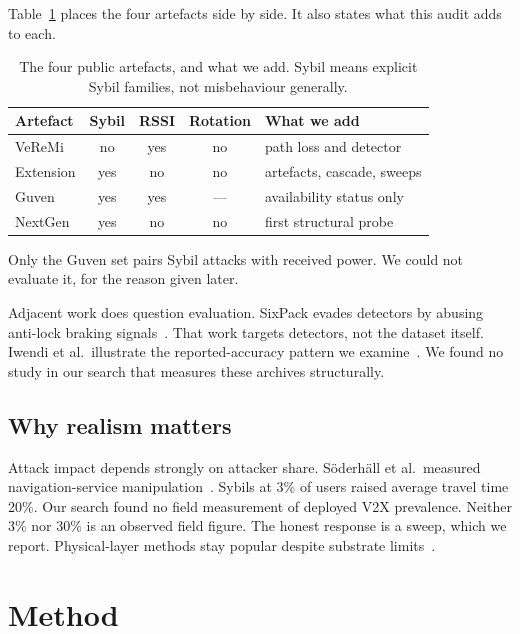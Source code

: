 \documentclass[journal,twoside]{IEEEtran}
\begin{document}
Table~\ref{tab:datasets} places the four artefacts side by side.
It also states what this audit adds to each.

\begin{table}[t]
\caption{The four public artefacts, and what we add.
Sybil means explicit Sybil families, not misbehaviour generally.}
\label{tab:datasets}
\centering
\scriptsize
\begin{tabular}{@{}>{\raggedright\arraybackslash}p{1.7cm}ccc>{\raggedright\arraybackslash}p{2.0cm}@{}}
\toprule
Artefact & Sybil & RSSI & Rotation & What we add \\
\midrule
VeReMi \cite{heijden2018} & no & yes & no & path loss and detector \\
Extension \cite{kamel2020} & yes & no & no & artefacts, cascade, sweeps \\
Guven \cite{guven2024} & yes & yes & --- & availability status only \\
NextGen \cite{nextgen2026} & yes & no & no & first structural probe \\
\bottomrule
\end{tabular}
\end{table}

Only the Guven set pairs Sybil attacks with received power.
We could not evaluate it, for the reason given later.

Adjacent work does question evaluation.
SixPack evades detectors by abusing anti-lock braking signals~\cite{sixpack2021}.
That work targets detectors, not the dataset itself.
Iwendi et al.\ illustrate the reported-accuracy pattern we examine~\cite{iwendi2018}.
We found no study in our search that measures these archives structurally.

\subsection{Why realism matters}

Attack impact depends strongly on attacker share.
S\"oderh\"all et al.\ measured navigation-service manipulation~\cite{soderhall2025}.
Sybils at 3\% of users raised average travel time 20\%.
Our search found no field measurement of deployed V2X prevalence.
Neither 3\% nor 30\% is an observed field figure.
The honest response is a sweep, which we report.
Physical-layer methods stay popular despite substrate limits~\cite{taysi2025,almesaeed2025}.

\section{Method}
\end{document}
